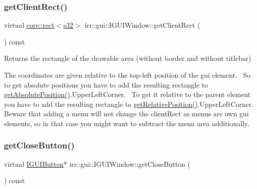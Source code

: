 \subsubsection{\texorpdfstring{get\+Client\+Rect()}{getClientRect()}}
{\footnotesize\ttfamily virtual \hyperlink{classirr_1_1core_1_1rect}{core\+::rect}$<$\hyperlink{namespaceirr_ac66849b7a6ed16e30ebede579f9b47c6}{s32}$>$ irr\+::gui\+::\+I\+G\+U\+I\+Window\+::get\+Client\+Rect (\begin{DoxyParamCaption}{ }\end{DoxyParamCaption}) const\hspace{0.3cm}{\ttfamily [pure virtual]}}



Returns the rectangle of the drawable area (without border and without titlebar) 

The coordinates are given relative to the top-\/left position of the gui element.~\newline
 So to get absolute positions you have to add the resulting rectangle to \hyperlink{classirr_1_1gui_1_1IGUIElement_a6c5b94dd889533a306a03e25d0998bdf}{get\+Absolute\+Position()}.Upper\+Left\+Corner.~\newline
 To get it relative to the parent element you have to add the resulting rectangle to \hyperlink{classirr_1_1gui_1_1IGUIElement_a056c893bcfe330c9c6058b6027a45cef}{get\+Relative\+Position()}.Upper\+Left\+Corner. Beware that adding a menu will not change the client\+Rect as menus are own gui elements, so in that case you might want to subtract the menu area additionally. \mbox{\label{classirr_1_1gui_1_1IGUIWindow_ae5b6abf3c9d8d0af5539adf3fea8db70}} 
\subsubsection{\texorpdfstring{get\+Close\+Button()}{getCloseButton()}}
{\footnotesize\ttfamily virtual \hyperlink{classirr_1_1gui_1_1IGUIButton}{I\+G\+U\+I\+Button}$\ast$ irr\+::gui\+::\+I\+G\+U\+I\+Window\+::get\+Close\+Button (\begin{DoxyParamCaption}{ }\end{DoxyParamCaption}) const\hspace{0.3cm}{\ttfamily [pure virtual]}}



